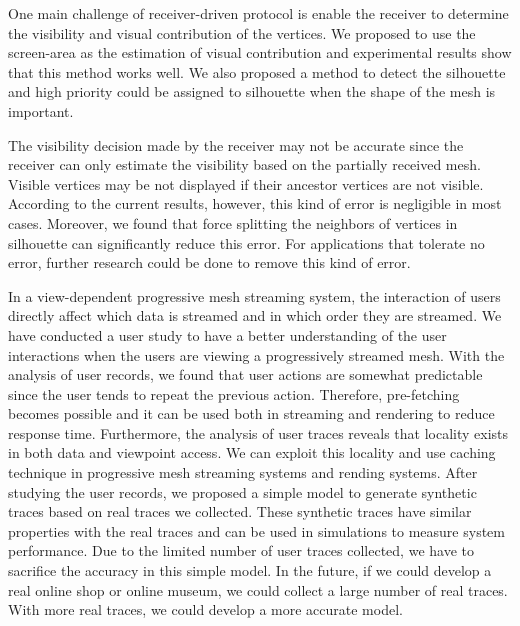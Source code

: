 \documentclass[11pt, a4paper]{report}
\begin{document}
One main challenge of receiver-driven protocol is enable the receiver
to determine the visibility and visual contribution of the vertices.
We proposed to use the screen-area as the estimation of visual contribution and 
experimental results show that this method works well. We also proposed a method
to detect the silhouette and high priority could be assigned to silhouette when the
shape of the mesh is important. 

The visibility decision made by the receiver may not be accurate 
since the receiver can only estimate the visibility based on
the partially received mesh. 
Visible vertices may be not displayed if their ancestor vertices are not visible. 
According to the current results, however, this kind of error is negligible in most cases. 
Moreover, we found that force splitting the neighbors of vertices in silhouette can significantly reduce this error.
For applications that tolerate no error, 
further research could be done to remove this kind of error. 

In a view-dependent progressive mesh streaming system, the interaction of users directly
affect which data is streamed and in which order they are streamed.
We have conducted a user study to have a better understanding of the user interactions when the users are 
viewing a progressively streamed mesh.
With the analysis of user records, we found that user actions are 
somewhat predictable since the user tends to repeat the previous 
action. 
Therefore, pre-fetching becomes possible and it can be used both in streaming and rendering to
reduce response time.
Furthermore, the analysis of user traces reveals that locality exists in both data and viewpoint access. 
We can exploit this locality and use caching technique in progressive mesh streaming systems and rending systems.
After studying the user records, we proposed a simple model 
to generate synthetic traces based on real traces we collected. 
These synthetic traces have similar properties with the real traces and 
can be used in simulations to measure system performance.
Due to the limited number of user traces collected, we have to 
sacrifice the accuracy in this simple model. In the future, if we could develop a real 
online shop or online museum, we could collect a large number of real traces.
With more real traces, we could develop a more accurate model.
\end{document}
